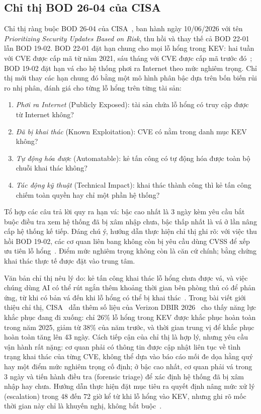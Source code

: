 \documentclass[runningheads]{llncs}
\begin{document}
\subsection{Chỉ thị BOD 26-04 của CISA}
\begin{sloppypar}
Chỉ thị ràng buộc BOD 26-04 của CISA~\cite{bod2604}, ban hành ngày 10/06/2026 với tên
\emph{Prioritizing Security Updates Based on Risk}, thu hồi và thay thế cả BOD 22-01 lẫn BOD 19-02. BOD 22-01 đặt hạn chung cho mọi lỗ hổng trong KEV: hai tuần với CVE được cấp mã từ năm 2021, sáu tháng với CVE được cấp mã trước đó~\cite{bod2201}; BOD 19-02 đặt hạn vá cho hệ thống phơi ra Internet theo mức nghiêm trọng. Chỉ thị mới thay các hạn chung đó bằng một mô hình phân bậc dựa trên bốn biến rủi ro nhị phân, đánh giá cho từng lỗ hổng trên từng tài sản:
\end{sloppypar}
\begin{enumerate}
\item \emph{Phơi ra Internet} (Publicly Exposed): tài sản chứa lỗ hổng có truy cập được từ Internet không?
\item \emph{Đã bị khai thác} (Known Exploitation): CVE có nằm trong danh mục KEV không?
\item \emph{Tự động hóa được} (Automatable): kẻ tấn công có tự động hóa được toàn bộ chuỗi khai thác không?
\item \emph{Tác động kỹ thuật} (Technical Impact): khai thác thành công thì kẻ tấn công chiếm toàn quyền hay chỉ một phần hệ thống?
\end{enumerate}
Tổ hợp các câu trả lời quy ra hạn vá: bậc cao nhất là 3 ngày kèm yêu cầu bắt buộc điều tra xem hệ thống đã bị
xâm nhập chưa, bậc thấp nhất là vá ở lần nâng cấp hệ thống kế tiếp. Đáng chú ý, hướng dẫn thực hiện chỉ thị ghi rõ: với việc thu hồi BOD 19-02, các cơ quan liên bang không còn bị yêu cầu dùng CVSS để xếp ưu tiên lỗ hổng~\cite{bod2604ig}. Điểm mức nghiêm trọng không còn là căn cứ chính; bằng chứng khai thác thực tế được đặt vào trung tâm.

Văn bản chỉ thị nêu lý do: kẻ tấn công khai thác lỗ hổng chưa được vá, và việc chúng dùng AI có thể rút ngắn thêm khoảng thời gian bên phòng thủ có để phản ứng, từ khi có bản vá đến khi lỗ hổng có thể bị khai thác~\cite{bod2604}. Trong bài viết giới thiệu chỉ thị, CISA~\cite{cisablog2026} dẫn thêm số liệu của Verizon DBIR 2026~\cite{dbir2026} cho thấy năng lực khắc phục đang đi xuống: chỉ 26\% lỗ hổng trong KEV được khắc phục hoàn toàn trong năm 2025, giảm từ 38\% của năm trước, và thời gian trung vị để khắc phục hoàn toàn tăng lên 43 ngày.
Cách tiếp cận của chỉ thị là hợp lý, nhưng yêu cầu vận hành rất nặng: cơ quan phải có thông tin được cập nhật liên tục về tình trạng khai thác
của từng CVE, không thể dựa vào báo cáo mối đe dọa hằng quý hay một điểm mức nghiêm trọng
cố định; ở bậc cao nhất, cơ quan phải vá trong 3 ngày và tiến hành điều tra (forensic triage) để xác định hệ thống đã bị xâm nhập hay chưa. Hướng dẫn thực hiện đặt mục tiêu ra quyết định nâng mức xử lý (escalation) trong 48 đến 72 giờ kể từ khi lỗ hổng vào KEV, nhưng ghi rõ mốc thời gian này chỉ là khuyến nghị, không bắt buộc~\cite{bod2604ig}.
\end{document}
